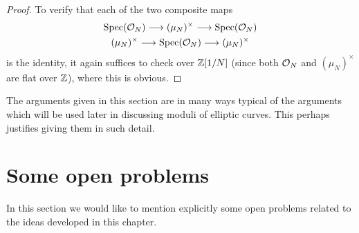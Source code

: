 \begin{proof}
To verify that each of the two composite maps
\begin{gather*}
\operatorname{Spec}(\mathcal{O}_N) \longrightarrow (\mu_N)^\times \longrightarrow \operatorname{Spec}(\mathcal{O}_N) \\
(\mu_N)^\times \longrightarrow \operatorname{Spec}(\mathcal{O}_N) \longrightarrow (\mu_N)^\times
\end{gather*}
is the identity, it again suffices to check over $\mathbb{Z}[1/N]$ (since both $\mathcal{O}_N$ and $(\mu_N)^\times$ are flat over $\mathbb{Z}$), where this is obvious.
\end{proof}

\begin{remark}\label{rem:1.12.10}
The arguments given in this section are in many ways typical of the arguments which will be used later in discussing moduli of elliptic curves. This perhaps justifies giving them in such detail.
\end{remark}

\section{Some open problems}\label{sec:1.13}

In this section we would like to mention explicitly some open problems related to the ideas developed in this chapter.

